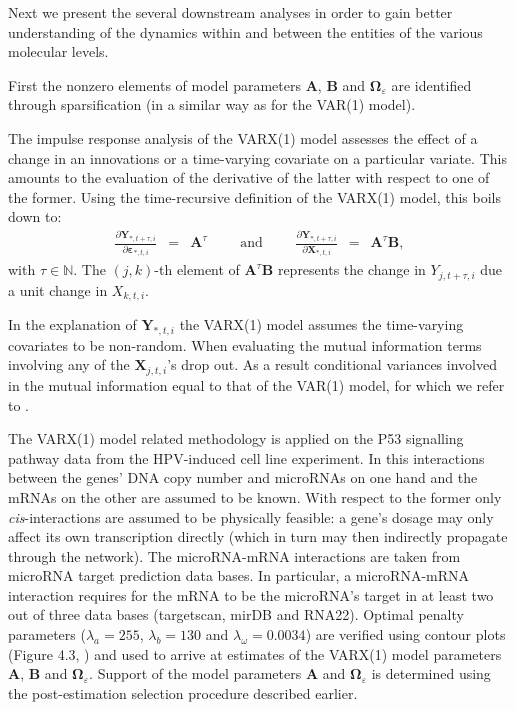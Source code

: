 {Next we present the several downstream analyses in order to gain better understanding of the dynamics within and between the entities of the various molecular levels. 
\begin{compactitem}
\item  First the nonzero elements of model parameters $\mathbf{A}$, $\mathbf{B}$ and $\boldsymbol{\Omega}_{\varepsilon}$ are identified through sparsification (in a similar way as for the VAR(1) model). 

\item The impulse response analysis of the VARX(1) model assesses the effect of a change in an innovations or a time-varying covariate on a particular variate. This amounts to the evaluation of the derivative of the latter with respect to one of the former. Using the time-recursive definition of the VARX(1) model, this boils down to:
\begin{eqnarray*}
\frac{\partial \mathbf{Y}_{\ast,t+\tau,i}}{\partial \boldsymbol{\varepsilon}_{\ast,t,i}} & = & \mathbf{A}^{\tau} \qquad \mbox{ and } \qquad \frac{\partial \mathbf{Y}_{\ast,t+\tau,i}}{\partial \mathbf{X}_{\ast,t,i}} \, \, \,  = \, \, \,  \mathbf{A}^{\tau} \mathbf{B},
\end{eqnarray*}
with $\tau \in \mathbb{N}$. The $(j,k)$-th element of $\mathbf{A}^{\tau}\mathbf{B}$ represents the change in $Y_{j,t+\tau, i}$ due a unit change in $X_{k,t,i}$.

\item In the explanation of $\mathbf{Y}_{\ast, t, i}$ the VARX(1) model assumes the time-varying covariates to be non-random. When evaluating the mutual information terms involving any of the $\mathbf{X}_{j, t, i}$'s drop out. As a result conditional variances involved in the mutual information equal to that of the VAR(1) model, for which we refer to \cite{Miok2017}.
\end{compactitem}

The VARX(1) model related methodology is applied on the P53 signalling pathway data from the HPV-induced cell line experiment. In this interactions between the genes' DNA copy number and microRNAs on one hand and the mRNAs on the other are assumed to be known. With respect to the former only \textit{cis}-interactions are assumed to be physically feasible: a gene's dosage may only affect its own transcription directly (which in turn may then indirectly propagate through the network). The microRNA-mRNA interactions are taken from microRNA target prediction data bases. In particular, a microRNA-mRNA interaction requires for the mRNA to be the microRNA's target in at least two out of three data bases (targetscan, mirDB and RNA22). Optimal penalty parameters ($\lambda_a=255$, $\lambda_b=130$ and $\lambda_{\omega}=0.0034$) are verified using contour plots (Figure 4.3, \cite{Supp2018}) and used to arrive at estimates of the VARX(1) model parameters $\mathbf{A}$, $\mathbf{B}$ and $\mathbf{\Omega}_{\varepsilon}$. Support of the model parameters $\mathbf{A}$ and $\mathbf{\Omega}_{\varepsilon}$ is determined using the post-estimation selection procedure described earlier. 

}
